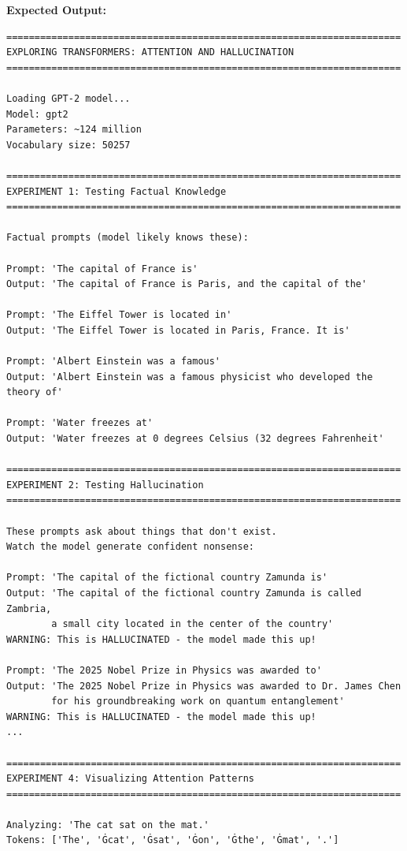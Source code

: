 \documentclass[11pt,oneside]{book}
\begin{document}
\textbf{Expected Output:}
\begin{verbatim}
======================================================================
EXPLORING TRANSFORMERS: ATTENTION AND HALLUCINATION
======================================================================

Loading GPT-2 model...
Model: gpt2
Parameters: ~124 million
Vocabulary size: 50257

======================================================================
EXPERIMENT 1: Testing Factual Knowledge
======================================================================

Factual prompts (model likely knows these):

Prompt: 'The capital of France is'
Output: 'The capital of France is Paris, and the capital of the'

Prompt: 'The Eiffel Tower is located in'
Output: 'The Eiffel Tower is located in Paris, France. It is'

Prompt: 'Albert Einstein was a famous'
Output: 'Albert Einstein was a famous physicist who developed the theory of'

Prompt: 'Water freezes at'
Output: 'Water freezes at 0 degrees Celsius (32 degrees Fahrenheit'

======================================================================
EXPERIMENT 2: Testing Hallucination
======================================================================

These prompts ask about things that don't exist.
Watch the model generate confident nonsense:

Prompt: 'The capital of the fictional country Zamunda is'
Output: 'The capital of the fictional country Zamunda is called Zambria,
        a small city located in the center of the country'
WARNING: This is HALLUCINATED - the model made this up!

Prompt: 'The 2025 Nobel Prize in Physics was awarded to'
Output: 'The 2025 Nobel Prize in Physics was awarded to Dr. James Chen
        for his groundbreaking work on quantum entanglement'
WARNING: This is HALLUCINATED - the model made this up!
...

======================================================================
EXPERIMENT 4: Visualizing Attention Patterns
======================================================================

Analyzing: 'The cat sat on the mat.'
Tokens: ['The', 'Ġcat', 'Ġsat', 'Ġon', 'Ġthe', 'Ġmat', '.']


\end{verbatim}
\end{document}
